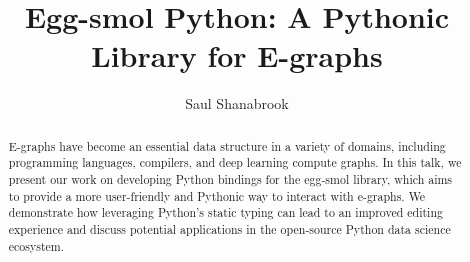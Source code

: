 \documentclass[sigplan,screen,review]{acmart}
\begin{document}
\VerbatimFootnotes
\title{Egg-smol Python: A Pythonic Library for E-graphs}

\author{Saul Shanabrook}


\begin{abstract}
E-graphs have become an essential data structure in a variety of domains, including programming languages, compilers, and deep learning compute graphs. In this talk, we present our work on developing Python bindings for the egg-smol library, which aims to provide a more user-friendly and Pythonic way to interact with e-graphs. We demonstrate how leveraging Python's static typing can lead to an improved editing experience
and discuss potential applications in the open-source Python data science ecosystem.
\end{abstract}

\end{document}
